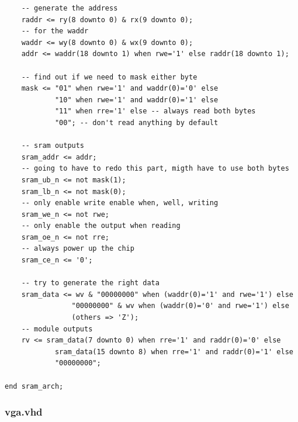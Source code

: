 \documentclass{article}
\begin{document}
\begin{lstlisting}
	-- generate the address
	raddr <= ry(8 downto 0) & rx(9 downto 0);
	-- for the waddr
	waddr <= wy(8 downto 0) & wx(9 downto 0);
	addr <= waddr(18 downto 1) when rwe='1' else raddr(18 downto 1);

	-- find out if we need to mask either byte
	mask <= "01" when rwe='1' and waddr(0)='0' else
			"10" when rwe='1' and waddr(0)='1' else
			"11" when rre='1' else -- always read both bytes
			"00"; -- don't read anything by default

	-- sram outputs
	sram_addr <= addr;
	-- going to have to redo this part, migth have to use both bytes
	sram_ub_n <= not mask(1);
	sram_lb_n <= not mask(0);
	-- only enable write enable when, well, writing
	sram_we_n <= not rwe;
	-- only enable the output when reading
	sram_oe_n <= not rre;
	-- always power up the chip
	sram_ce_n <= '0';

	-- try to generate the right data
	sram_data <= wv & "00000000" when (waddr(0)='1' and rwe='1') else
				"00000000" & wv when (waddr(0)='0' and rwe='1') else
				(others => 'Z');
	-- module outputs
	rv <= sram_data(7 downto 0) when rre='1' and raddr(0)='0' else
			sram_data(15 downto 8) when rre='1' and raddr(0)='1' else
			"00000000";

end sram_arch;
\end{lstlisting}

\subsubsection{vga.vhd}							%
\end{document}
